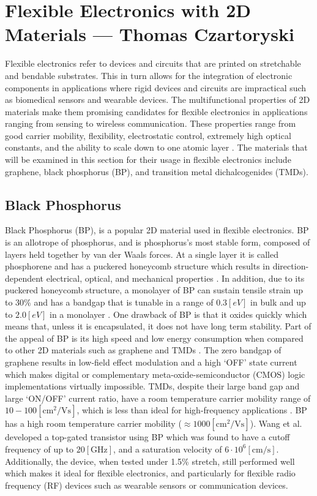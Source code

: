 \documentclass[conference]{IEEEtran}
\begin{document}
\section{Flexible Electronics with 2D Materials — Thomas Czartoryski}

Flexible electronics refer to devices and circuits that are printed on stretchable and bendable substrates. This in turn allows for the integration of electronic components in applications where rigid devices and circuits are impractical such as biomedical sensors and wearable devices. The multifunctional properties of 2D materials make them promising candidates for flexible electronics in applications ranging from sensing to wireless communication. These properties range from good carrier mobility, flexibility, electrostatic control, extremely high optical constants, and the ability to scale down to one atomic layer \cite{tc1}. The materials that will be examined in this section for their usage in flexible electronics include graphene, black phosphorus (BP), and transition metal dichalcogenides (TMDs).

\subsection{Black Phosphorus}

Black Phosphorus (BP), is a popular 2D material used in flexible electronics. BP is an allotrope of phosphorus, and is phosphorus's most stable form, composed of layers held together by van der Waals forces. At a single layer it is called phosphorene and has a puckered honeycomb structure which results in direction-dependent electrical, optical, and mechanical properties \cite{tc2,tc3}. In addition, due to its puckered honeycomb structure, a monolayer of BP can sustain tensile strain up to 30\% and has a bandgap that is tunable in a range of $0.3[\si{eV}]$ in bulk and up to $2.0[\si{eV}]$ in a monolayer \cite{tc3}. One drawback of BP is that it oxides quickly which means that, unless it is encapsulated, it does not have long term stability. Part of the appeal of BP is its high speed and low energy consumption when compared to other 2D materials such as graphene and TMDs \cite{tc2}. The zero bandgap of graphene results in low-field effect modulation and a high `\textsc{OFF}' state current which makes digital or complementary meta-oxide-semiconductor (CMOS) logic implementations virtually impossible. TMDs, despite their large band gap and large `\textsc{ON/OFF}' current ratio, have a room temperature carrier mobility range of $10-100[\si{\centi\meter\squared\per\volt\second}]$, which is less than ideal for high-frequency applications \cite{tc4}. BP has a high room temperature carrier mobility ($\approx1000[\si{\centi\meter\squared\per\volt\second}]$). Wang et al. \cite{tc4} developed a top-gated transistor using BP which was found to have a cutoff frequency of up to $20[\si{\giga\hertz}]$, and a saturation velocity of $6\cdot10^6[\si{\centi\meter\per\second}]$. Additionally, the device, when tested under 1.5\% stretch, still performed well which makes it ideal for flexible electronics, and particularly for flexible radio frequency (RF) devices such as wearable sensors or communication devices.
\end{document}
